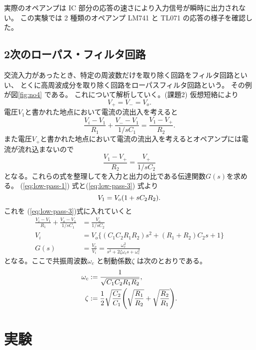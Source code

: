 \documentclass[11pt,dvipdfmx,a4paper]{jsarticle}
\begin{document}
実際のオペアンプは IC 部分の応答の速さにより入力信号が瞬時に出力されない。
この実験では 2 種類のオペアンプ LM741 と TL071 の応答の様子を確認した。


\subsection{2次のローパス・フィルタ回路}

交流入力があったとき、特定の周波数だけを取り除く回路をフィルタ回路といい、
とくに高周波成分を取り除く回路をローパスフィルタ回路という。
その例が図\ref{fig:no4} である。
これについて解析していく。(課題2)
仮想短絡により
\begin{equation}
	V_{+} = V_{-} = V_o. \label{eq:low-pass-1}
\end{equation}
電圧\(V_1\)と書かれた地点において電流の流出入を考えると
\begin{equation}
	\frac{V_i-V_1}{R_1}+\frac{V_{-}-V_1}{1/sC_1} = \frac{V_1-V_{+}}{R_2} \label{eq:low-pass-2}.
\end{equation}
また電圧\(V_{+}\)と書かれた地点において電流の流出入を考えるとオペアンプには電流が流れ込まないので
\begin{equation}
	\frac{V_1-V_{+}}{R_2} = \frac{V_{+}}{1/sC_2} \label{eq:low-pass-3}
\end{equation}
となる。これらの式を整理してを入力と出力の比である伝達関数\(G(s)\)を求める。
(\ref{eq:low-pass-1}) 式と(\ref{eq:low-pass-3}) 式より
\begin{equation}
	V_1 = V_o \qty(1+sC_2 R_2).
\end{equation}
これを (\ref{eq:low-pass-3})式に入れていくと
\begin{align}
	\frac{V_i-V_1}{R_1}+\frac{V_{o}-V_1}{1/sC_1} &= \frac{V_{o}}{1/sC_2}\\
	V_i &= V_o \biggl\{(C_1C_2R_1R_2)s^2+(R_1+R_2)C_2s+1\biggr\}\\
	G(s) &= \frac{V_o}{V_i} = \frac{\omega_c^2}{s^2+2\zeta\omega_c s+\omega_c^2}
\end{align}
となる。ここで共振周波数\(\omega_c\) と制動係数\(\zeta\) は次のとおりである。
\begin{align}
	\omega_c &:= \frac{1}{\sqrt{C_1C_2R_1R_2}},\\
	\zeta &:= \frac{1}{2}\sqrt{\frac{C_2}{C_1}}\qty(\sqrt{\frac{R_1}{R_2}}+\sqrt{\frac{R_2}{R_1}}).
\end{align}

\section{実験}
\end{document}

